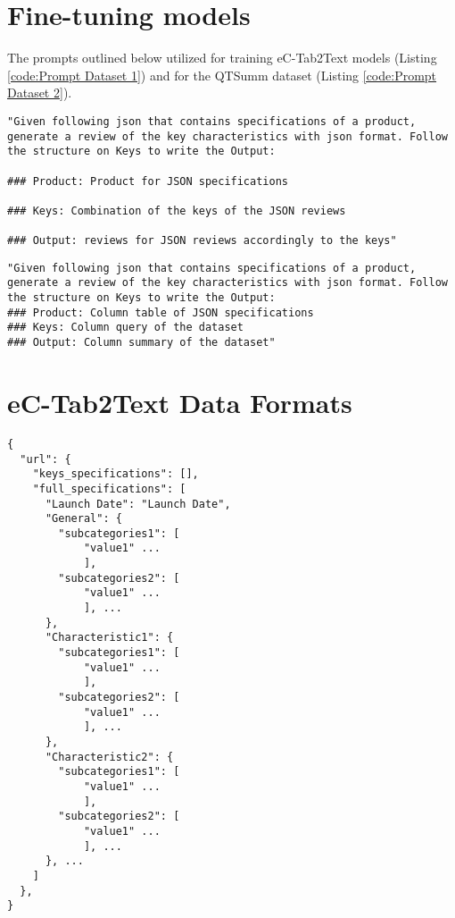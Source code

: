 \section{Fine-tuning models}
\label{appendix:fine-tuning-models}

The prompts outlined below utilized for training eC-Tab2Text models (Listing \ref{code:Prompt Dataset 1}) and for the QTSumm dataset (Listing \ref{code:Prompt Dataset 2}).

\begin{lstlisting}[style=textstyle, frame = single, caption=Prompt structure for eC-Tab2Text, label=code:Prompt Dataset 1]
"Given following json that contains specifications of a product, generate a review of the key characteristics with json format. Follow the structure on Keys to write the Output: 

### Product: Product for JSON specifications

### Keys: Combination of the keys of the JSON reviews

### Output: reviews for JSON reviews accordingly to the keys"
\end{lstlisting}

\vspace{1cm}

\begin{lstlisting}[style=textstyle, frame = single, caption=Prompt structure for QTSumm, label=code:Prompt Dataset 2]
"Given following json that contains specifications of a product, generate a review of the key characteristics with json format. Follow the structure on Keys to write the Output: 
### Product: Column table of JSON specifications
### Keys: Column query of the dataset
### Output: Column summary of the dataset"
\end{lstlisting}

\section{eC-Tab2Text Data Formats} 
\label{Appendix: eC-Tab2Text Data Collection}

\begin{lstlisting}[style=jsonstyle, frame = single, caption=JSON Data Format Product specification, label=code:JSON-specs]
{
  "url": {
    "keys_specifications": [],
    "full_specifications": [
      "Launch Date": "Launch Date",
      "General": {
        "subcategories1": [
            "value1" ...
            ],
        "subcategories2": [
            "value1" ...
            ], ...
      },
      "Characteristic1": {
        "subcategories1": [
            "value1" ...
            ],
        "subcategories2": [
            "value1" ...
            ], ...
      },
      "Characteristic2": {
        "subcategories1": [
            "value1" ...
            ],
        "subcategories2": [
            "value1" ...
            ], ...
      }, ...
    ]
  },
}
\end{lstlisting}


